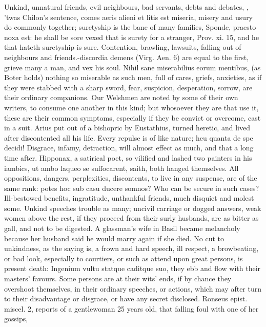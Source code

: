 {Unkind, unnatural friends, evil neighbours, bad servants, debts and
debates, \etc{}, 'twas Chilon's sentence, comes aeris alieni et litis est
miseria, misery and usury do commonly together; suretyship is the bane
of many families, Sponde, praesto noxa est: he shall be sore vexed that
is surety for a stranger, Prov. xi. 15, and he that hateth suretyship
is sure. Contention, brawling, lawsuits, falling out of neighbours and
friends.-discordia demens (Virg. Aen. 6) are equal to the first,
grieve many a man, and vex his soul. Nihil sane miserabilius eorum
mentibus, (as Boter holds) nothing so miserable as such men, full
of cares, griefs, anxieties, as if they were stabbed with a sharp
sword, fear, suspicion, desperation, sorrow, are their ordinary
companions. Our Welshmen are noted by some of their own writers,
to consume one another in this kind; but whosoever they are that use
it, these are their common symptoms, especially if they be convict or
overcome, cast in a suit. Arius put out of a bishopric by
Eustathius, turned heretic, and lived after discontented all his life.
Every repulse is of like nature; heu quanta de spe decidi!
Disgrace, infamy, detraction, will almost effect as much, and that a
long time after. Hipponax, a satirical poet, so vilified and lashed two
painters in his iambics, ut ambo laqueo se suffocarent, \Pliny{}
saith, both hanged themselves. All oppositions, dangers, perplexities,
discontents, to live in any suspense, are of the same rank: potes
hoc sub casu ducere somnos? Who can be secure in such cases?
Ill-bestowed benefits, ingratitude, unthankful friends, much disquiet
and molest some. Unkind speeches trouble as many; uncivil carriage or
dogged answers, weak women above the rest, if they proceed from their
surly husbands, are as bitter as gall, and not to be digested. A
glassman's wife in Basil became melancholy because her husband said he
would marry again if she died. No cut to unkindness, as the saying is,
a frown and hard speech, ill respect, a browbeating, or bad look,
especially to courtiers, or such as attend upon great persons, is
present death: Ingenium vultu statque caditque suo, they ebb and flow
with their masters' favours. Some persons are at their wits' ends, if
by chance they overshoot themselves, in their ordinary speeches, or
actions, which may after turn to their disadvantage or disgrace, or
have any secret disclosed. Ronseus epist. miscel. 2, reports of a
gentlewoman 25 years old, that falling foul with one of her gossips,
}
